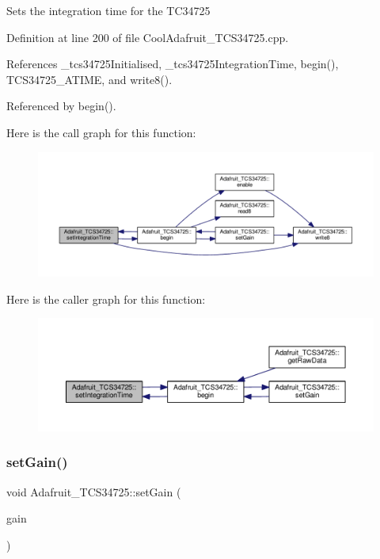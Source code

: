 Sets the integration time for the T\+C34725 

Definition at line 200 of file Cool\+Adafruit\+\_\+\+T\+C\+S34725.\+cpp.



References \+\_\+tcs34725\+Initialised, \+\_\+tcs34725\+Integration\+Time, begin(), T\+C\+S34725\+\_\+\+A\+T\+I\+ME, and write8().



Referenced by begin().

Here is the call graph for this function\+:\nopagebreak
\begin{figure}[H]
\begin{center}
\leavevmode
\includegraphics[width=350pt]{df/d54/class_adafruit___t_c_s34725_a3c89fe5d4eea1f24f31d1afa9de8f0f3_cgraph}
\end{center}
\end{figure}
Here is the caller graph for this function\+:\nopagebreak
\begin{figure}[H]
\begin{center}
\leavevmode
\includegraphics[width=350pt]{df/d54/class_adafruit___t_c_s34725_a3c89fe5d4eea1f24f31d1afa9de8f0f3_icgraph}
\end{center}
\end{figure}
\mbox{\label{class_adafruit___t_c_s34725_a6be06315a9d33f76e44550f574f023a5}} 
\subsubsection{\texorpdfstring{set\+Gain()}{setGain()}}
{\footnotesize\ttfamily void Adafruit\+\_\+\+T\+C\+S34725\+::set\+Gain (\begin{DoxyParamCaption}\item[{\hyperlink{_cool_adafruit___t_c_s34725_8h_a23611ba111ac38012551332ee7189f9a}{tcs34725\+Gain\+\_\+t}}]{gain }\end{DoxyParamCaption})}

